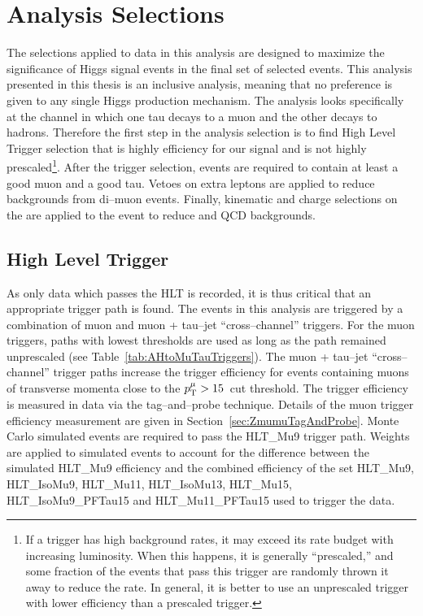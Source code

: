 \ifx\master\undefined\fi
%
\chapter{Analysis Selections} \label{ch:selections}
%
The selections applied to data in this analysis are designed to maximize the
significance of Higgs signal events in the final set of selected events.  This
analysis presented in this thesis is an inclusive analysis, meaning that no
preference is given to any single Higgs production mechanism.  The analysis
looks specifically at the channel in which one tau decays to a muon and the
other decays to hadrons.  Therefore the first step in the analysis selection is
to find High Level Trigger selection that is highly efficiency for our signal
and is not highly prescaled\footnote{If a trigger has high background rates, it
may exceed its rate budget with increasing luminosity.  When this happens, it is
generally ``prescaled,'' and some fraction of the events that pass this
trigger are randomly thrown it away to reduce the rate.  In general, it is
better to use an unprescaled trigger with lower efficiency than a prescaled
trigger.}.  After the trigger selection, events are required to contain at least
a good muon and a good tau.  Vetoes on extra leptons are applied to reduce
backgrounds from di--muon events.  Finally, kinematic and charge selections on
the are applied to the event to reduce \WpJets and QCD backgrounds.

\section{High Level Trigger}
As only data which passes the HLT is recorded, it is thus critical that an
appropriate trigger path is found. The events in this analysis are
triggered by a combination of muon and muon + tau--jet ``cross--channel''
triggers. For the muon triggers, paths with lowest \pt thresholds are used as
long as the path remained unprescaled (see Table~\ref{tab:AHtoMuTauTriggers}).
The muon + tau--jet ``cross--channel'' trigger paths increase the trigger
efficiency for events containing muons of transverse momenta close to the
$p_{\mathrm{T}}^{\mu} > 15$~\GeVc cut threshold.  The trigger efficiency is measured in
data via the tag--and--probe technique. Details of the muon trigger efficiency
measurement are given in Section~\ref{sec:ZmumuTagAndProbe}.  Monte Carlo
simulated events are required to pass the HLT\_Mu9 trigger path. Weights are
applied to simulated events to account for the difference between the simulated
HLT\_Mu9 efficiency and the combined efficiency of the set HLT\_Mu9,
HLT\_IsoMu9, HLT\_Mu11, HLT\_IsoMu13, HLT\_Mu15, HLT\_IsoMu9\_PFTau15 and
HLT\_Mu11\_PFTau15 used to trigger the data.


